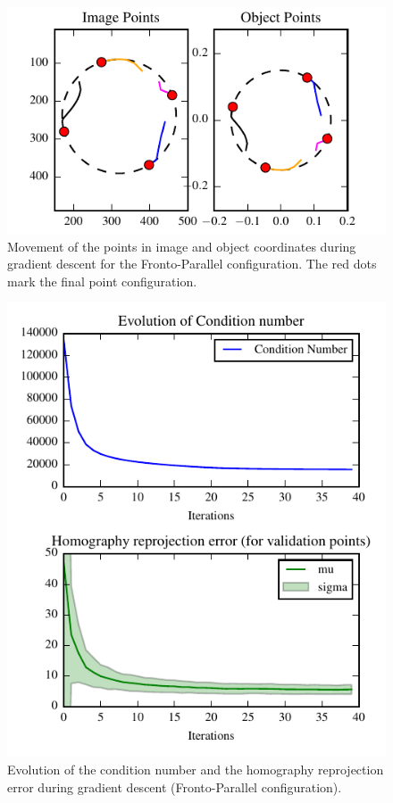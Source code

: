\documentclass[letterpaper, 10 pt, conference]{ieeeconf}  %
\begin{document}
\begin{figure}[t]
  \begin{center}
    \includegraphics[width=\columnwidth]{img/image_control_points.pdf}
    \caption{\label{fig:homography_results} Movement of the points in image and object coordinates during gradient descent for the Fronto-Parallel configuration. The red dots mark the final point configuration.}
  \end{center}
\end{figure}

\begin{figure}[t]
  \begin{center}
    \includegraphics[width=\columnwidth]{img/homography_fronto_parallel.pdf}
    \caption{\label{fig:homography_results} Evolution of the condition number and the homography reprojection error during gradient descent (Fronto-Parallel configuration).}
  \end{center}
\end{figure}
\end{document}
